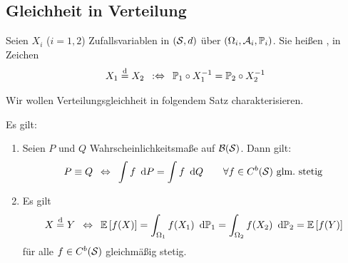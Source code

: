 
\subsection{Gleichheit in Verteilung}
\begin{definition} \label{definition: 3.16}
	Seien $X_i$ ($i = 1,2$) Zufallsvariablen in $(\S,d)$ über $(\Omega_i,\A_i,\P_i)$. Sie heißen , in Zeichen
	\begin{align*}
		X_1 \disteq X_2 \defequiv \P_1 \circ X_1^{-1} = \P_2 \circ X_2^{-1}
	\end{align*}
\end{definition}

Wir wollen Verteilungsgleichheit in folgendem Satz charakterisieren.

\begin{satz} \label{satz: 3.17}
	Es gilt:
	\begin{enumerate}[label=(\alph*)]
		\item \label{it: 3.17f} Seien $P$ und $Q$ Wahrscheinlichkeitsmaße auf $\B(\S)$. Dann gilt:
		\begin{equation*}
			P \equiv Q
			\equivalent
			\int f \diffskip P = \int f \diffskip Q \qquad \forall f \in C^b(\S) \text{ glm.\ stetig}
		\end{equation*}
		\item \label{it: 3.17E} Es gilt
		\begin{equation*}
			X \disteq Y \equivalent
			\EW[f(X)] = \int_{\Omega_1} f(X_1)  \diffskip{\P_1} = \int_{\Omega_2} f(X_2)  \diffskip{\P_2} = \EW[f(Y)]
		\end{equation*}
		für alle $f \in C^b(\S)$ gleichmäßig stetig.
	\end{enumerate}
\end{satz}


